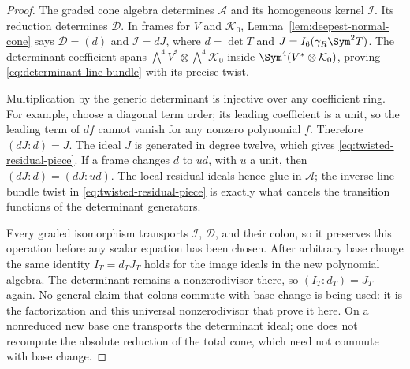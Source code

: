 \begin{proof}
The graded cone algebra determines \(\mathcal A\) and its
homogeneous kernel \(\mathcal I\).  Its reduction determines
\(\mathcal D\).  In frames for \(V\) and \(\mathcal K_0\),
Lemma~\ref{lem:deepest-normal-cone} says
\(\mathcal D=(d)\) and \(\mathcal I=dJ\), where
\(d=\det T\) and \(J=I_6(\gamma_R\Sym^2T)\).
The determinant coefficient spans
\(\bigwedge^4V^*\otimes\bigwedge^4\mathcal K_0\) inside
\(\Sym^4(V^*\otimes\mathcal K_0)\), proving
\eqref{eq:determinant-line-bundle} with its precise twist.

Multiplication by the generic determinant is injective over any
coefficient ring.  For example, choose a diagonal term order; its
leading coefficient is a unit, so the leading term of \(df\)
cannot vanish for any nonzero polynomial \(f\).  Therefore
\((dJ:d)=J\).  The ideal \(J\) is generated in degree twelve,
which gives \eqref{eq:twisted-residual-piece}.  If a frame changes
\(d\) to \(ud\), with \(u\) a unit, then
\((dJ:d)=(dJ:ud)\).  The local residual ideals hence glue in
\(\mathcal A\); the inverse line-bundle twist in
\eqref{eq:twisted-residual-piece} is exactly what cancels the
transition functions of the determinant generators.

Every graded isomorphism transports \(\mathcal I\),
\(\mathcal D\), and their colon, so it preserves this operation
before any scalar equation has been chosen.  After arbitrary base
change the same identity \(I_T=d_TJ_T\) holds for the image ideals
in the new polynomial algebra.  The determinant remains a
nonzerodivisor there, so \((I_T:d_T)=J_T\) again.  No general
claim that colons commute with base change is being used: it is the
factorization and this universal nonzerodivisor that prove it here.
On a nonreduced new base one transports the determinant ideal;
one does not recompute the absolute reduction of the total cone,
which need not commute with base change.
\end{proof}
